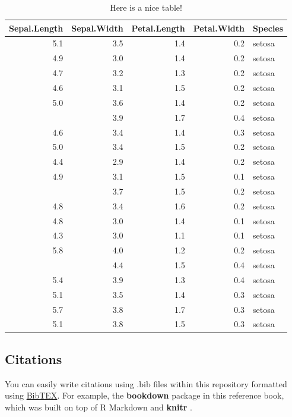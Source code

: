 \documentclass[
]{book}
\begin{document}
\begin{table}

\caption{\label{tab:nice-tab}Here is a nice table!}
\centering
\begin{tabular}[t]{rrrrl}
\toprule
Sepal.Length & Sepal.Width & Petal.Length & Petal.Width & Species\\
\midrule
5.1 & 3.5 & 1.4 & 0.2 & setosa\\
4.9 & 3.0 & 1.4 & 0.2 & setosa\\
4.7 & 3.2 & 1.3 & 0.2 & setosa\\
4.6 & 3.1 & 1.5 & 0.2 & setosa\\
5.0 & 3.6 & 1.4 & 0.2 & setosa\\
\addlinespace
5.4 & 3.9 & 1.7 & 0.4 & setosa\\
4.6 & 3.4 & 1.4 & 0.3 & setosa\\
5.0 & 3.4 & 1.5 & 0.2 & setosa\\
4.4 & 2.9 & 1.4 & 0.2 & setosa\\
4.9 & 3.1 & 1.5 & 0.1 & setosa\\
\addlinespace
5.4 & 3.7 & 1.5 & 0.2 & setosa\\
4.8 & 3.4 & 1.6 & 0.2 & setosa\\
4.8 & 3.0 & 1.4 & 0.1 & setosa\\
4.3 & 3.0 & 1.1 & 0.1 & setosa\\
5.8 & 4.0 & 1.2 & 0.2 & setosa\\
\addlinespace
5.7 & 4.4 & 1.5 & 0.4 & setosa\\
5.4 & 3.9 & 1.3 & 0.4 & setosa\\
5.1 & 3.5 & 1.4 & 0.3 & setosa\\
5.7 & 3.8 & 1.7 & 0.3 & setosa\\
5.1 & 3.8 & 1.5 & 0.3 & setosa\\
\bottomrule
\end{tabular}
\end{table}

\hypertarget{citations}{%
\subsection{Citations}\label{citations}}

You can easily write citations using .bib files within this repository formatted using \href{http://www.bibtex.org/}{BibTEX}. For example, the \textbf{bookdown} package \citep{R-bookdown} in this reference book, which was built on top of R Markdown and \textbf{knitr} \citep{xie2015}.
\end{document}
